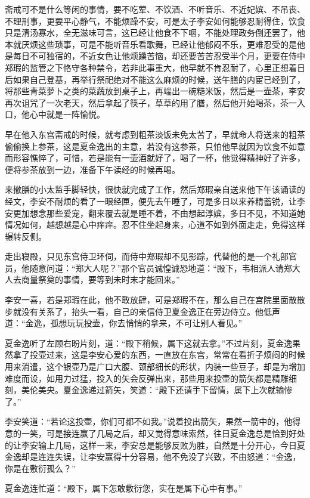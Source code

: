 斋戒可不是什么等闲的事情，要不吃荤、不饮酒、不听音乐、不近妃嫔、不吊丧、不理刑事，更要平心静气，不能烦躁不安，可是太子李安如何能够忍耐得住，饮食只是清汤寡水，全无滋味可言，这已经让他食不下咽，不能处理政务倒还罢了，他本就厌烦这些琐事，可是不能听音乐看歌舞，已经让他郁闷不乐，更难忍受的是他是每日不可独宿的，不近女色让他烦躁苦恼，却还要苦苦忍受半个月，更要在侍中郑瑕的监管之下恪守各种禁令，若非此事重大，他早就不肯忍耐了，心里正想着日后如果自己登基，再举行祭祀绝对不能这么麻烦的时候，送午膳的内宦已经到了，将那些青菜萝卜之类的菜蔬放到桌子上，再端出一碗糙米饭，然后是一壶茶，李安再次诅咒了一次老天，然后拿起了筷子，草草的用了膳，然后他开始喝茶，茶一入口，他心中就是一阵愉悦。

早在他入东宫斋戒的时候，就考虑到粗茶淡饭未免太苦了，早就命人将送来的粗茶偷偷换上参茶，这是夏金逸出的主意，若没有这参茶，只怕他早就因为饮食不如意而形容憔悴了，可惜，若是能有一壶酒就好了，喝了一杯，他觉得精神好了许多，便将参茶放到一边，准备下午读经的时候再喝。

来撤膳的小太监手脚轻快，很快就完成了工作，然后郑瑕亲自送来他下午该诵读的经文，李安不耐烦的看了一眼经匣，便先去午睡了，可是多日以来养精蓄锐，让李安更加想念那些爱宠，翻来覆去就是睡不着，不由想起淳嫔，多日不见，不知道她情况如何，越想越是心中痒痒。忍不住坐起身来，心道不如到外面走走，免得这样辗转反侧。

走出寝殿，只见东宫侍卫环伺，而侍中郑瑕却不见影踪，代替他的是一个礼部官员，他随意问道：“郑大人呢？”那个官员诚惶诚恐地道：“殿下，韦相派人请郑大人去商量祭奠的事情，要等到未时末才能回来。”

李安一喜，若是郑瑕在此，他不敢放肆，可是郑瑕不在，那么自己在宫院里面散散步就没有关系了，抬头一看，自己的亲信侍卫夏金逸正在旁边侍立。他低声道：“金逸，孤想玩玩投壶，你去悄悄的拿来，不可让别人看见。”

夏金逸听了左顾右盼片刻，道：“殿下稍候，属下这就去拿。”不过片刻，夏金逸果然拿了投壶过来，这是李安心爱的东西，一直放在东宫，常常在看折子烦闷的时候用来消遣，这个银壶乃是广口大腹、颈部细长的形状，内装一些豆子，却是为增加难度而设，如用力过猛，投入的矢会反弹出来，那些用来投壶的箭矢都是精雕细刻，美伦美央。夏金逸递过箭矢，笑道：“殿下还请手下留情，属下上次就输惨了。”

李安笑道：“若论这投壶，你们可都不如我。”说着投出箭矢，果然一箭中的，他得意的一笑，可是接连赢了几局之后，却又觉得意味索然，往日夏金逸总是恰到好处的让李安输上几局，这样一来，李安总是能够反败为胜，自然是十分开心，今日夏金逸却是连连失误，让李安赢得十分容易，他不免没了兴致，不由怒道：“金逸，你是在敷衍孤么？”

夏金逸连忙道：“殿下，属下怎敢敷衍您，实在是属下心中有事。”

